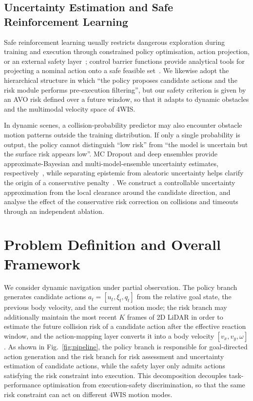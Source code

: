 \documentclass[10pt,a4paper,twocolumn]{article}
\begin{document}
\subsection{Uncertainty Estimation and Safe Reinforcement Learning}

Safe reinforcement learning usually restricts dangerous exploration during training and execution through constrained policy optimisation, action projection, or an external safety layer~\cite{garcia2015safe,achiam2017cpo,dalal2018safetylayer}; control barrier functions provide analytical tools for projecting a nominal action onto a safe feasible set~\cite{ames2017cbf}. We likewise adopt the hierarchical structure in which ``the policy proposes candidate actions and the risk module performs pre-execution filtering'', but our safety criterion is given by an AVO risk defined over a future window, so that it adapts to dynamic obstacles and the multimodal velocity space of 4WIS.

In dynamic scenes, a collision-probability predictor may also encounter obstacle motion patterns outside the training distribution. If only a single probability is output, the policy cannot distinguish ``low risk'' from ``the model is uncertain but the surface risk appears low''. MC Dropout and deep ensembles provide approximate-Bayesian and multi-model-ensemble uncertainty estimates, respectively~\cite{gal2016dropout,lakshminarayanan2017ensembles}, while separating epistemic from aleatoric uncertainty helps clarify the origin of a conservative penalty~\cite{kendall2017uncertainties}. We construct a controllable uncertainty approximation from the local clearance around the candidate direction, and analyse the effect of the conservative risk correction on collisions and timeouts through an independent ablation.

\section{Problem Definition and Overall Framework}

We consider dynamic navigation under partial observation. The policy branch generates candidate actions $a_t=[u_t,\xi_t,q_t]$ from the relative goal state, the previous body velocity, and the current motion mode; the risk branch may additionally maintain the most recent $K$ frames of 2D LiDAR in order to estimate the future collision risk of a candidate action after the effective reaction window, and the action-mapping layer converts it into a body velocity $[v_x,v_y,\omega]$. As shown in Fig.~\ref{fig:pipeline}, the policy branch is responsible for goal-directed action generation and the risk branch for risk assessment and uncertainty estimation of candidate actions, while the safety layer only admits actions satisfying the risk constraint into execution. This decomposition decouples task-performance optimisation from execution-safety discrimination, so that the same risk constraint can act on different 4WIS motion modes.
\end{document}

